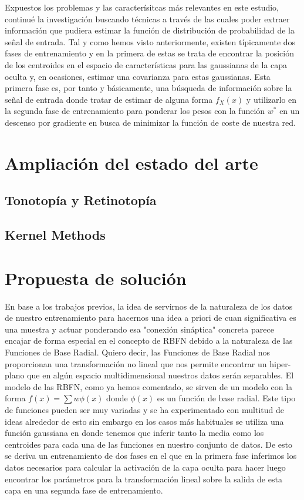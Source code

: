 \documentclass[10pt,a4paper]{report}
\begin{document}
Expuestos los problemas y las caracterísitcas más relevantes en este estudio, continué la investigación buscando técnicas a través de las cuales poder extraer información que pudiera estimar la función de distribución de probabilidad de la señal de entrada. Tal y como hemos visto anteriormente, existen típicamente dos fases de entrenamiento y en la primera de estas se trata de encontrar la posición de los centroides en el espacio de características para las gaussianas de la capa oculta y, en ocasiones, estimar una covarianza para estas gaussianas. Esta primera fase es, por tanto y básicamente, una búsqueda de información sobre la señal de entrada donde tratar de estimar de alguna forma $f_X(x)$ y utilizarlo en la segunda fase de entrenamiento para ponderar los pesos con la función $w^*$ en un descenso por gradiente en busca de minimizar la función de coste de nuestra red.

\section{Ampliación del estado del arte}

\subsection{Tonotopía y Retinotopía}
\subsection{Kernel Methods}
\section{Propuesta de solución}
En base a los trabajos previos, la idea de servirnos de la naturaleza de los datos de nuestro entrenamiento para hacernos una idea a priori de cuan significativa es una muestra y actuar ponderando esa "conexión sináptica" concreta parece encajar de forma especial en el concepto de RBFN debido a la naturaleza de las Funciones de Base Radial. Quiero decir, las Funciones de Base Radial nos proporcionan una transformación no lineal que nos permite encontrar un hiper-plano que en algún espacio multidimensional nuestros datos serán separables. El modelo de las RBFN, como ya hemos comentado, se sirven de un modelo con la forma $f(x)=\sum w \phi(x)$ donde $\phi(x)$ es un función de base radial. Este tipo de funciones pueden ser muy variadas y se ha experimentado con multitud de ideas alrededor de esto sin embargo en los casos más habituales se utiliza una función gaussiana en donde tenemos que inferir tanto la media como los centroides para cada una de las funciones en nuestro conjunto de datos. De esto se deriva un entrenamiento de dos fases en el que en la primera fase inferimos los datos necesarios para calcular la activación de la capa oculta para hacer luego encontrar los parámetros para la transformación lineal sobre la salida de esta capa en una segunda fase de entrenamiento.
\end{document}
